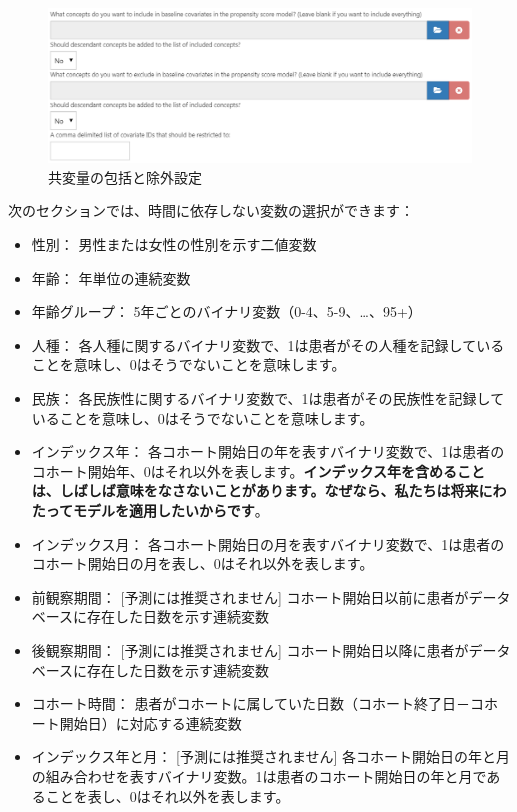 \documentclass[
  11pt]{book}
\theoremstyle{definition}
\theoremstyle{definition}
\theoremstyle{definition}
\theoremstyle{definition}
\theoremstyle{remark}
\begin{document}
\begin{figure}

{\centering \includegraphics[width=1\linewidth]{images/PatientLevelPrediction/covariateSettings1} 

}

\caption{共変量の包括と除外設定}\label{fig:covariateSettings1}
\end{figure}

次のセクションでは、時間に依存しない変数の選択ができます：

\begin{itemize}
\item
  性別： 男性または女性の性別を示す二値変数
\item
  年齢： 年単位の連続変数
\item
  年齢グループ： 5年ごとのバイナリ変数（0-4、5-9、\ldots、95+）
\item
  人種： 各人種に関するバイナリ変数で、1は患者がその人種を記録していることを意味し、0はそうでないことを意味します。
\item
  民族： 各民族性に関するバイナリ変数で、1は患者がその民族性を記録していることを意味し、0はそうでないことを意味します。
\item
  インデックス年： 各コホート開始日の年を表すバイナリ変数で、1は患者のコホート開始年、0はそれ以外を表します。\textbf{インデックス年を含めることは、しばしば意味をなさないことがあります。なぜなら、私たちは将来にわたってモデルを適用したいからです}。
\item
  インデックス月： 各コホート開始日の月を表すバイナリ変数で、1は患者のコホート開始日の月を表し、0はそれ以外を表します。
\item
  前観察期間： {[}予測には推奨されません{]} コホート開始日以前に患者がデータベースに存在した日数を示す連続変数
\item
  後観察期間： {[}予測には推奨されません{]} コホート開始日以降に患者がデータベースに存在した日数を示す連続変数
\item
  コホート時間： 患者がコホートに属していた日数（コホート終了日－コホート開始日）に対応する連続変数
\item
  インデックス年と月： {[}予測には推奨されません{]} 各コホート開始日の年と月の組み合わせを表すバイナリ変数。1は患者のコホート開始日の年と月であることを表し、0はそれ以外を表します。
\end{itemize}
\end{document}

